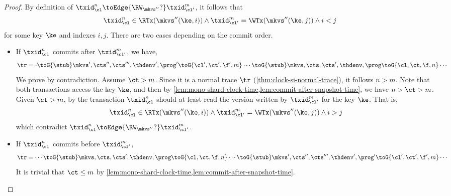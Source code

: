 \begin{proof}
    By definition of \( \txid_\cl^n \toEdge{\RW_{\mkvs''}?} \txid_{\cl'}^m \),
    it follows that
    \[
        \txid_\cl^n \in \RTx(\mkvs''(\ke,i)) 
        \land \txid_{\cl'}^m = \WTx(\mkvs''(\ke,j)) 
        \land i < j
    \]                              
    for some key \( \ke \) and indexes \( i,j \).
    There are two cases depending on the commit order.
    \begin{itemize}
        \item If \( \txid_\cl^n \) commits after \( \txid_{\cl'}^m  \),
            we have,
            \[
                \begin{array}{@{}l@{}}
                \tr = \cdot \toG{\stub} \mkvs',\cts'',\cts''',\thdenv', \prog' \toG{\cl',\ct',\f',m} \cdots
                \toG{\stub} \mkvs,\cts,\cts',\thdenv, \prog \toG{\cl,\ct,\f,n} \cdots \\
                \end{array}
            \]
            We prove by contradiction.
            Assume \( \ct > m \).
            Since it is a normal trace \( \tr \) (\cref{thm:clock-si-normal-trace}), 
            it follows \( n > m \).
            Note that both transactions access the key \( \ke \), and then by \cref{lem:mono-shard-clock-time,lem:commit-after-snapshot-time}, we have \( n > \ct > m  \).
            Given \( \ct > m \), by  the transaction \( \txid_\cl^n \) should at least read the version written by \( \txid_{\cl'}^m \) for the key \( \ke \).
            That is,
            \[
                \txid_\cl^n \in \RTx(\mkvs''(\ke,i)) 
                \land \txid_{\cl'}^m = \WTx(\mkvs''(\ke,j)) 
                \land i > j
            \]
            which contradict  \( \txid_\cl^n \toEdge{\RW_{\mkvs''}?} \txid_{\cl'}^m  \).
        \item If \( \txid_\cl^n \) commits before \( \txid_{\cl'}^m  \),
            \[
                \begin{array}{@{}l@{}}
                    \tr = \cdots \toG{\stub} \mkvs,\cts,\cts',\thdenv, \prog \toG{\cl,\ct,\f,n} \cdots
                    \toG{\stub} \mkvs',\cts'',\cts''',\thdenv', \prog' \toG{\cl',\ct',\f',m} \cdots
                \end{array}
            \]
            It is trivial that \( \ct \leq m \) by \cref{lem:mono-shard-clock-time,lem:commit-after-snapshot-time}.
    \end{itemize}
\end{proof}


